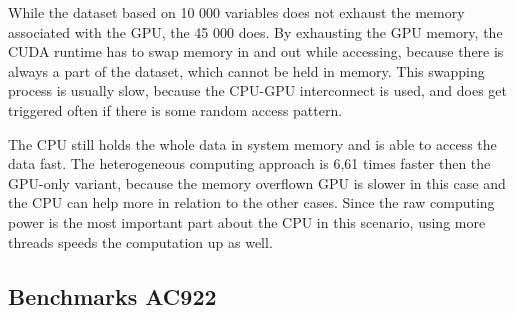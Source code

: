 While the dataset based on 10 000 variables does not exhaust the memory associated with the GPU, the 45 000 does. By exhausting the GPU memory, the CUDA runtime has to swap memory in and out while accessing, because there is always a part of the dataset, which cannot be held in memory. This swapping process is usually slow, because the CPU-GPU interconnect is used, and does get triggered often if there is some random access pattern.

The CPU still holds the whole data in system memory and is able to access the data fast. The heterogeneous computing approach is 6,61 times faster then the GPU-only variant, because the memory overflown GPU is slower in this case and the CPU can help more in relation to the other cases.
Since the raw computing power is the most important part about the CPU in this scenario, using more threads speeds the computation up as well.


\subsection{Benchmarks AC922}






